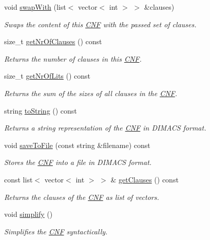 \begin{DoxyCompactItemize}
void \hyperlink{classCNF_a39c340549f7acdc1393a5572f3e007cf}{swap\-With} (list$<$ vector$<$ int $>$ $>$ \&clauses)
\begin{DoxyCompactList}\small\item\em Swaps the content of this \hyperlink{classCNF}{C\-N\-F} with the passed set of clauses. \end{DoxyCompactList}\item 
size\-\_\-t \hyperlink{classCNF_ad0bf994acbde601aa482f3d94ef1cb71}{get\-Nr\-Of\-Clauses} () const 
\begin{DoxyCompactList}\small\item\em Returns the number of clauses in this \hyperlink{classCNF}{C\-N\-F}. \end{DoxyCompactList}\item 
size\-\_\-t \hyperlink{classCNF_a4fafd0324a1c4c7f345b8df7f931aafa}{get\-Nr\-Of\-Lits} () const 
\begin{DoxyCompactList}\small\item\em Returns the sum of the sizes of all clauses in the \hyperlink{classCNF}{C\-N\-F}. \end{DoxyCompactList}\item 
string \hyperlink{classCNF_ae15ec06cc22d6cda868febd1708d331b}{to\-String} () const 
\begin{DoxyCompactList}\small\item\em Returns a string representation of the \hyperlink{classCNF}{C\-N\-F} in D\-I\-M\-A\-C\-S format. \end{DoxyCompactList}\item 
void \hyperlink{classCNF_aefe201cf4139e1ed2f4dfdcb2f8efdae}{save\-To\-File} (const string \&filename) const 
\begin{DoxyCompactList}\small\item\em Stores the \hyperlink{classCNF}{C\-N\-F} into a file in D\-I\-M\-A\-C\-S format. \end{DoxyCompactList}\item 
const list$<$ vector$<$ int $>$ $>$ \& \hyperlink{classCNF_a9532acac619c098668460a4c97cbbc0f}{get\-Clauses} () const 
\begin{DoxyCompactList}\small\item\em Returns the clauses of the \hyperlink{classCNF}{C\-N\-F} as list of vectors. \end{DoxyCompactList}\item 
void \hyperlink{classCNF_a7a3345272f6c5332aa5118e80284f61f}{simplify} ()
\begin{DoxyCompactList}\small\item\em Simplifies the \hyperlink{classCNF}{C\-N\-F} syntactically. \end{DoxyCompactList}\item 

\end{DoxyCompactItemize}
